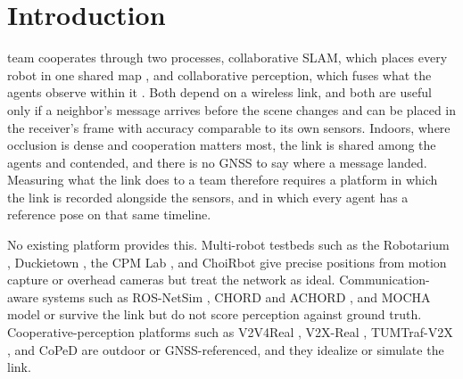 \documentclass[journal]{IEEEtran}
\begin{document}
\section{Introduction}
\label{sec:introduction}
 team cooperates through two processes, collaborative SLAM,
which places every robot in one shared map \cite{swarmslam,doorslam,
kimeramulti}, and collaborative perception, which fuses what the agents
observe within it \cite{where2comm,zhou2022gnnperception}. Both depend
on a wireless link, and both are useful only if a neighbor's message
arrives before the scene changes and can be placed in the receiver's
frame with accuracy comparable to its own sensors. Indoors, where
occlusion is dense and cooperation matters most, the link is shared
among the agents and contended, and there is no GNSS to say where a
message landed. Measuring what the link does to a team therefore
requires a platform in which the link is recorded alongside the
sensors, and in which every agent has a reference pose on that same
timeline.

No existing platform provides this. Multi-robot testbeds such as the
Robotarium \cite{pickem2017robotarium,wilson2021robotarium},
Duckietown \cite{paull2017duckietown}, the CPM Lab
\cite{kloock2021cpmlab}, and ChoiRbot \cite{testa2021choirbot} give
precise positions from motion capture or overhead cameras but treat
the network as ideal. Communication-aware systems such as ROS-NetSim
\cite{calvofullana2021rosnetsim}, CHORD and ACHORD
\cite{ginting2021chord,saboia2022achord}, and MOCHA
\cite{cladera2024mocha} model or survive the link but do not score
perception against ground truth. Cooperative-perception platforms such
as V2V4Real \cite{v2v4real}, V2X-Real \cite{v2xreal}, TUMTraf-V2X
\cite{zimmer2024tumtrafv2x}, and CoPeD \cite{coped} are outdoor or
GNSS-referenced, and they idealize or simulate the link.
\end{document}
